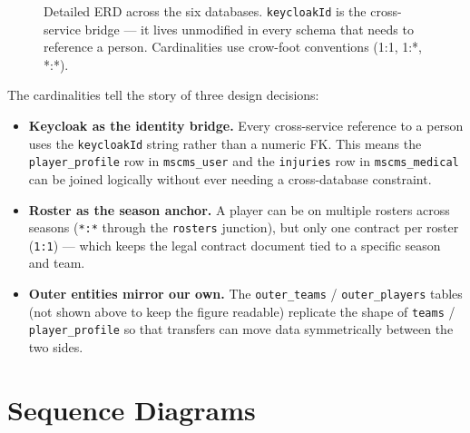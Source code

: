 \documentclass[12pt,a4paper,oneside]{report}
\begin{document}
\begin{figure}[ht]
\caption{Detailed ERD across the six databases. \texttt{keycloakId}
         is the cross-service bridge — it lives unmodified in every
         schema that needs to reference a person. Cardinalities use
         crow-foot conventions (1:1, 1:*, *:*).}
\label{fig:erd-detail}
\end{figure}

The cardinalities tell the story of three design decisions:
\begin{itemize}[leftmargin=*]
  \item \textbf{Keycloak as the identity bridge.} Every cross-service
        reference to a person uses the \texttt{keycloakId} string
        rather than a numeric FK. This means the
        \texttt{player\_profile} row in \texttt{mscms\_user} and the
        \texttt{injuries} row in \texttt{mscms\_medical} can be
        joined logically without ever needing a cross-database
        constraint.
  \item \textbf{Roster as the season anchor.} A player can be on
        multiple rosters across seasons (\texttt{*:*} through the
        \texttt{rosters} junction), but only one contract per
        roster (\texttt{1:1}) --- which keeps the legal contract
        document tied to a specific season and team.
  \item \textbf{Outer entities mirror our own.} The
        \texttt{outer\_teams} / \texttt{outer\_players} tables (not
        shown above to keep the figure readable) replicate the
        shape of \texttt{teams} / \texttt{player\_profile} so that
        transfers can move data symmetrically between the two sides.
\end{itemize}

\chapter{Sequence Diagrams}
\label{ch:sequence}
\end{document}

